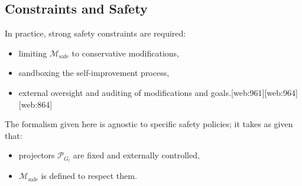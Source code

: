 \documentclass[12pt]{article}
\begin{document}
\subsection{Constraints and Safety}

In practice, strong safety constraints are required:
\begin{itemize}
  \item limiting $\mathcal{M}_{\text{safe}}$ to conservative modifications,
  \item sandboxing the self-improvement process,
  \item external oversight and auditing of modifications and goals.[web:961][web:964][web:864]
\end{itemize}

The formalism given here is agnostic to specific safety policies; it
takes as given that:
\begin{itemize}
  \item projectors $\mathcal{P}_{G_l}$ are fixed and externally controlled,
  \item $\mathcal{M}_{\text{safe}}$ is defined to respect them.
\end{itemize}
\end{document}
